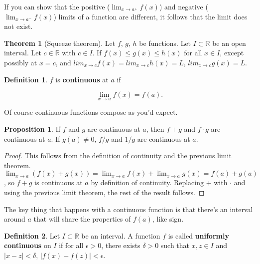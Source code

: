 \documentclass{article}
\theoremstyle{definition}
\newtheorem{definition}{Definition}[section]
\newtheorem{proposition}{Proposition}[section]
\newtheorem{theorem}{Theorem}[section]
\begin{document}
If you can show that the positive ($\lim_{x \to a^{+}} f(x)$) and negative
($\lim_{x \to a^{-}} f(x) $) limits of a function are
different, it follows that the limit does not exist.

\begin{theorem}[Squeeze theorem]
Let $f$, $g$, $h$ be functions. Let $I \subset \mathbb{R}$ be an open interval. Let $c \in \mathbb{R}$ with $c \in I$. If $f(x) \leq g(x) \leq h(x)$ for all $x \in I$, except possibly at $x = c$, and $lim_{x \to c} f(x) = lim_{x \to c} h(x) = L$, $lim_{x \to c} g(x) = L$.
\end{theorem}

\begin{definition}

$f$ is \textbf{continuous} at $a$ if

\begin{equation}
\lim_{x \to a} f(x) = f(a).
\end{equation}

\end{definition}

Of course continuous functions compose as you'd expect.

\begin{proposition}

If $f$ and $g$ are continuous at $a$, then $f+g$ and $f \cdot g$ are continuous
at $a$. If $g(a) \neq 0$, $f/g$ and $1/g$ are continuous at $a$.

\end{proposition}

\begin{proof}

This follows from the definition of continuity and the previous limit
theorem. $\lim_{x \to a} (f(x) + g(x)) = \lim_{x \to a} f(x) + \lim_{x \to a}
g(x) = f(a) + g(a)$, so $f + g$ is continuous at $a$ by definition of
continuity. Replacing $+$ with $\cdot$ and using the previous limit theorem, the
rest of the result follows.

\end{proof}

The key thing that happens with a continuous function is that there's an
interval around $a$ that will share the properties of $f(a)$, like sign.

\begin{definition}
Let $I \subset \mathbb{R}$ be an interval. A function $f$ is called \textbf{uniformly continuous} on $I$ if for all $\epsilon > 0$, there exists $\delta > 0$ such that $x, z \in I$ and $|x - z| < \delta$, $|f(x) - f(z)| < \epsilon$.
\end{definition}
\end{document}
